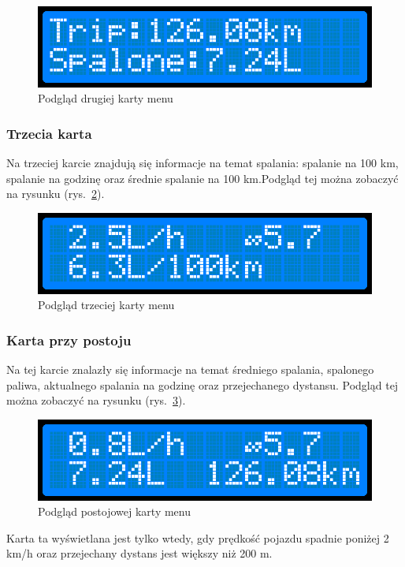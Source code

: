 \begin{figure}[!htb]
\centering
\includegraphics[width=0.7\linewidth]{Rysunki/menu2.png}
\caption{Podgląd drugiej karty menu}
\label{fig:menu2}
\end{figure}

\subsubsection{Trzecia karta}
Na trzeciej karcie znajdują się informacje na temat spalania: spalanie na 100 km, spalanie na godzinę oraz średnie spalanie na 100 km.Podgląd tej można zobaczyć na rysunku (rys.~\ref{fig:menu3}).

\begin{figure}[!htb]
\centering
\includegraphics[width=0.7\linewidth]{Rysunki/menu3.png}
\caption{Podgląd trzeciej karty menu}
\label{fig:menu3}
\end{figure}


\subsubsection{Karta przy postoju}
Na tej karcie znalazły się informacje na temat średniego spalania, spalonego paliwa, aktualnego spalania na godzinę oraz przejechanego dystansu. Podgląd tej można zobaczyć na rysunku (rys.~\ref{fig:menu0}).

\begin{figure}[!htb]
\centering
\includegraphics[width=0.7\linewidth]{Rysunki/menu0.png}
\caption{Podgląd postojowej karty menu}
\label{fig:menu0}
\end{figure}

Karta ta wyświetlana jest tylko wtedy, gdy prędkość pojazdu spadnie poniżej 2 km/h oraz przejechany dystans jest większy niż 200 m.

